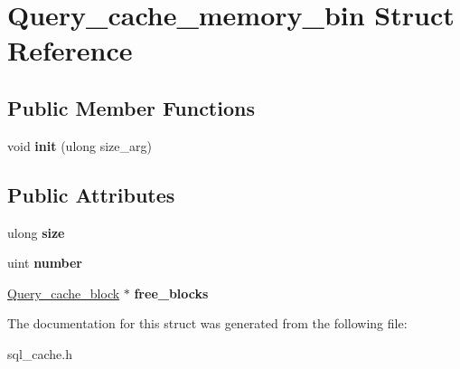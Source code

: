 \hypertarget{structQuery__cache__memory__bin}{}\section{Query\+\_\+cache\+\_\+memory\+\_\+bin Struct Reference}
\label{structQuery__cache__memory__bin}
\subsection*{Public Member Functions}
\begin{DoxyCompactItemize}
\item 
\mbox{\label{structQuery__cache__memory__bin_a1ad473c50367b3fca22e63698e723e44}} 
void {\bfseries init} (ulong size\+\_\+arg)
\end{DoxyCompactItemize}
\subsection*{Public Attributes}
\begin{DoxyCompactItemize}
\item 
\mbox{\label{structQuery__cache__memory__bin_af8afa78b32689bb842a7f39a4af304dc}} 
ulong {\bfseries size}
\item 
\mbox{\label{structQuery__cache__memory__bin_a3fa78865a4efc55701b66a2a54516cf8}} 
uint {\bfseries number}
\item 
\mbox{\label{structQuery__cache__memory__bin_a6fec393a4c811447290f78ca63cf669e}} 
\mbox{\hyperlink{structQuery__cache__block}{Query\+\_\+cache\+\_\+block}} $\ast$ {\bfseries free\+\_\+blocks}
\end{DoxyCompactItemize}


The documentation for this struct was generated from the following file\+:\begin{DoxyCompactItemize}
\item 
sql\+\_\+cache.\+h\end{DoxyCompactItemize}
